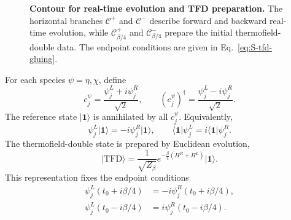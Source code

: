 \documentclass[11pt,a4paper]{article}
\begin{document}
\begin{figure}
\caption{\textbf{Contour for real-time evolution and TFD preparation.}
The horizontal branches \(\mathcal C^+\) and \(\mathcal C^-\) describe
forward and backward real-time evolution, while
\(\mathcal C^+_{\beta/4}\) and \(\mathcal C^-_{\beta/4}\) prepare the initial
thermofield-double data. The endpoint conditions are given in
Eq.~\eqref{eq:S-tfd-gluing}.}
\label{fig:S-kb-contour}
\end{figure}

For each species \(\psi=\eta,\chi\), define
\begin{equation}
c^\psi_j
=
\frac{\psi^L_j+i\psi^R_j}{\sqrt{2}},
\qquad
\left(c^\psi_j\right)^\dagger
=
\frac{\psi^L_j-i\psi^R_j}{\sqrt{2}} .
\label{eq:S-c-def}
\end{equation}
The reference state \(\lvert\mathbf 1\rangle\) is annihilated by all
\(c^\psi_j\). Equivalently,
\begin{equation}
\psi^L_j\lvert\mathbf 1\rangle
=
-i\psi^R_j\lvert\mathbf 1\rangle,
\qquad
\langle\mathbf 1\rvert\psi^L_j
=
i\langle\mathbf 1\rvert\psi^R_j .
\label{eq:S-identity-gluing}
\end{equation}
The thermofield-double state is prepared by Euclidean evolution,
\begin{equation}
\lvert\mathrm{TFD}\rangle
=
\frac{1}{\sqrt{Z_\beta}}
e^{-\frac{\beta}{4}(H^R+H^L)}
\lvert\mathbf 1\rangle .
\label{eq:S-tfd-state}
\end{equation}
This representation fixes the endpoint conditions
\begin{equation}
\begin{aligned}
\psi^L_j(t_0+i\beta/4)
&=
-i\psi^R_j(t_0+i\beta/4),
\\
\psi^L_j(t_0-i\beta/4)
&=
i\psi^R_j(t_0-i\beta/4).
\end{aligned}
\label{eq:S-tfd-gluing}
\end{equation}
\end{document}
